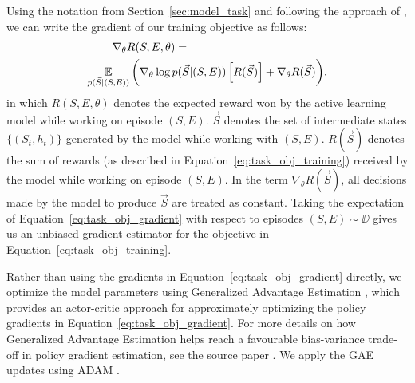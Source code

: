 Using the notation from Section~\ref{sec:model_task} and following the approach of \cite{schulman2015}, we can write the gradient of our training objective as follows:
\begin{align}
 \nabla_{\theta} R(& S, E, \theta) = \label{eq:task_obj_gradient} \\
 \operatorname*{\mathbb{E}}_{p(\vec{S} | (S, E))} \bigg(& \nabla_{\theta} \log p(\vec{S} | (S, E)) \left[ R(\vec{S}) \right] + \nabla_{\theta} R(\vec{S}) \bigg), \nonumber
\end{align}
in which $R(S, E, \theta)$ denotes the expected reward won by the active learning model while working on episode $(S, E)$. $\vec{S}$ denotes the set of intermediate states $\{(S_t, h_t)\}$ generated by the model while working with $(S, E)$. $R(\vec{S})$ denotes the sum of rewards (as described in Equation~\ref{eq:task_obj_training}) received by the model while working on episode $(S, E)$. In the term $\nabla_{\theta} R(\vec{S})$, all decisions made by the model to produce $\vec{S}$ are treated as constant. Taking the expectation of Equation~\ref{eq:task_obj_gradient} with respect to episodes $(S, E) \sim \DD$ gives us an unbiased gradient estimator for the objective in Equation~\ref{eq:task_obj_training}.

Rather than using the gradients in Equation~\ref{eq:task_obj_gradient} directly, we optimize the model parameters using Generalized Advantage Estimation \cite{schulman2016}, which provides an actor-critic approach for approximately optimizing the policy gradients in Equation~\ref{eq:task_obj_gradient}.
For more details on how Generalized Advantage Estimation helps reach a favourable bias-variance trade-off in policy gradient estimation, see the source paper \cite{schulman2016}. We apply the GAE updates using ADAM \cite{kingma2015}. 
